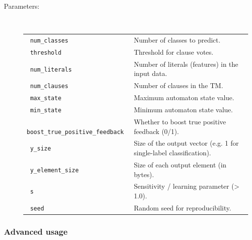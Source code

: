 \documentclass[english]{aghengthesis} %
\begin{document}
\begin{description}
    \item[Parameters:]\ %
    \begin{tabularx}{\textwidth}{XX}
        \texttt{ num\_classes } &	Number of classes to predict. \\
        \texttt{ threshold } &	Threshold for clause votes. \\
        \texttt{ num\_literals } &	Number of literals (features) in the input data.\\
        \texttt{ num\_clauses } &	Number of clauses in the TM.\\
        \texttt{ max\_state } &	Maximum automaton state value.\\
        \texttt{ min\_state } &	Minimum automaton state value.\\
        \texttt{ boost\_true\_positive\_feedback } &	Whether to boost true positive feedback (0/1).\\
        \texttt{ y\_size } &	Size of the output vector (e.g. 1 for single-label classification).\\
        \texttt{ y\_element\_size } &	Size of each output element (in bytes).\\
        \texttt{ s } &	Sensitivity / learning parameter (> 1.0).\\
        \texttt{ seed } &	Random seed for reproducibility. \\
    \end{tabularx}
\end{description}


\subsubsection{Advanced usage}
\end{document}
